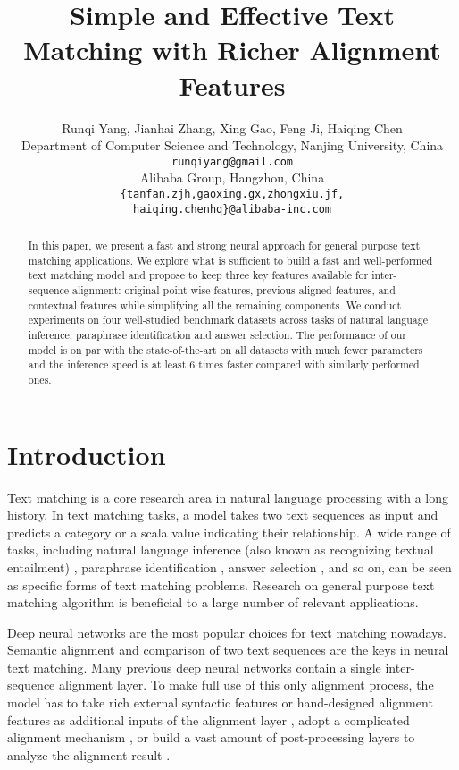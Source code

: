 \documentclass[11pt,a4paper]{article}
\title{Simple and Effective Text Matching with Richer Alignment Features}
\author{
  Runqi Yang, 
  Jianhai Zhang, Xing Gao, 
  Feng Ji, Haiqing Chen  \\
  Department of Computer Science and Technology, Nanjing University, China\\
  \texttt{runqiyang@gmail.com}\\
  Alibaba Group, Hangzhou, China\\
  \texttt{\{tanfan.zjh,gaoxing.gx,zhongxiu.jf,}\\
  \texttt{haiqing.chenhq\}@alibaba-inc.com}}
\date{}
\begin{document}
\maketitle
\begin{abstract}
  In this paper, we present a fast and strong neural approach for general purpose text matching applications. 
  We explore what is sufficient to build a fast and well-performed text matching model and propose to keep three key features available for inter-sequence alignment: original point-wise features, previous aligned features, and contextual features while simplifying all the remaining components.
  We conduct experiments on four well-studied benchmark datasets across tasks of natural language inference, paraphrase identification and answer selection. The performance of our model is on par with the state-of-the-art on all datasets with much fewer parameters and the inference speed is at least 6 times faster compared with similarly performed ones.
\end{abstract}

\section{Introduction}

Text matching is a core research area in natural language processing with a long history.
In text matching tasks, a model takes two text sequences as input and predicts a category or a scala value indicating their relationship.
A wide range of tasks, including natural language inference (also known as recognizing textual entailment) \cite{snli, scitail}, paraphrase identification \cite{wang2017bilateral}, answer selection \cite{wikiqa}, and so on, can be seen as specific forms of text matching problems. 
Research on general purpose text matching algorithm is beneficial to a large number of relevant applications.

Deep neural networks are the most popular choices for text matching nowadays. 
Semantic alignment and comparison of two text sequences are the keys in neural text matching. 
Many previous deep neural networks contain a single inter-sequence alignment layer. 
To make full use of this only alignment process, the model has to 
take rich external syntactic features or hand-designed alignment features as additional inputs of the alignment layer \cite{chen2017enhanced, gong2018natural},
adopt a complicated alignment mechanism \cite{wang2017bilateral, tan2018multiway}, 
or build a vast amount of post-processing layers to analyze the alignment result \cite{tay2018compare, gong2018natural}.
\end{document}
